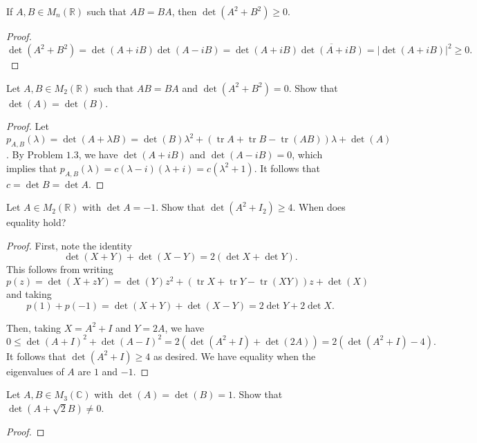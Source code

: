 \documentclass[11pt]{article}
\newcommand{\R}{\mathbb{R}}
\newcommand{\C}{\mathbb C}
\renewcommand{\>}{\rangle}
\newcommand{\<}{\langle}
\newcommand{\tr}{\operatorname{tr}}
\let \ol \overline
\begin{document}
\begin{problem} If $A, B \in M_n(\R)$ such that $AB = BA$, then $\det(A^2 + B^2) \ge 0$.
\end{problem}
\begin{proof}
$$\det(A^2 + B^2) = \det(A+iB)\det(A - iB) = \det(A + iB) \ol{\det(A + iB)} = |\det(A + iB)|^2\ge 0.$$
\end{proof}
\begin{problem} Let $A, B \in M_2(\R)$ such that $AB = BA$ and $\det(A^2 + B^2) = 0$.  Show that $\det(A) = \det(B)$.
\end{problem}
\begin{proof}
Let $p_{A, B}(\lambda) = \det(A + \lambda B) = \det(B) \lambda^2 + (\tr A + \tr B - \tr(AB)) \lambda + \det(A)$.  By Problem $1.3$, we have $\det(A + iB)$ and $\det(A-iB) = 0$, which implies that $p_{A, B}(\lambda) = c(\lambda - i)(\lambda + i) = c(\lambda^2 + 1)$.  It follows that $c = \det B = \det A$.
\end{proof}

\begin{problem} Let $A \in M_2(\R)$ with $\det A = -1$.  Show that $\det(A^2 + I_2) \ge 4$.  When does equality hold?
\end{problem}
\begin{proof}
First, note the identity 
$$\det(X+Y) + \det(X - Y) = 2(\det X+ \det Y).$$
This follows from writing $p(z) = \det(X + zY) = \det(Y) z^2 + (\tr X + \tr Y - \tr(XY)) z + \det(X)$ and taking 
$$p(1) + p(-1) = \det(X+Y) + \det(X - Y) = 2\det Y + 2 \det X.$$

Then, taking $X = A^2 + I$ and $Y = 2A$, we have 
$$0 \le  \det(A + I)^2 + \det(A - I)^2 = 2(\det(A^2 + I) + \det(2A)) = 2(\det(A^2 + I) - 4).$$
It follows that $\det(A^2 + I) \ge 4$ as desired.  We have equality when the eigenvalues of $A$ are $1$ and $-1$.  
\end{proof}

\begin{problem} Let $A, B \in M_3(\C)$ with $\det(A) = \det(B) = 1$.  Show that $\det(A + \sqrt{2} B) \ne 0$.
\end{problem}
\begin{proof}

\end{proof}
 
\end{document}
